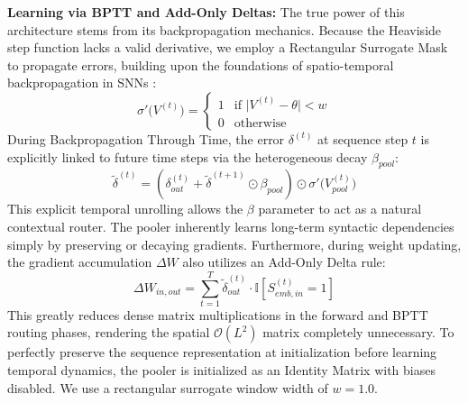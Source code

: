\documentclass{article} %
\begin{document}
\textbf{Learning via BPTT and Add-Only Deltas:} The true power of this architecture stems from its backpropagation mechanics. Because the Heaviside step function lacks a valid derivative, we employ a Rectangular Surrogate Mask to propagate errors, building upon the foundations of spatio-temporal backpropagation in SNNs \citep{neftci2019surrogate}:
\begin{equation}
\sigma'\big(V^{(t)}\big) = \begin{cases} 1 & \text{if } \big|V^{(t)} - \theta\big| < w \\ 0 & \text{otherwise} \end{cases}
\end{equation}
During Backpropagation Through Time, the error $\delta^{(t)}$ at sequence step $t$ is explicitly linked to future time steps via the heterogeneous decay $\beta_{pool}$:
\begin{equation}
\tilde{\delta}^{(t)} = \left( \delta_{out}^{(t)} + \tilde{\delta}^{(t+1)} \odot \beta_{pool} \right) \odot \sigma'\big(V_{pool}^{(t)}\big)
\end{equation}
This explicit temporal unrolling allows the $\beta$ parameter to act as a natural contextual router. The pooler inherently learns long-term syntactic dependencies simply by preserving or decaying gradients. Furthermore, during weight updating, the gradient accumulation $\Delta W$ also utilizes an Add-Only Delta rule:
\begin{equation}
\Delta W_{in, out} = \sum_{t=1}^{T} \tilde{\delta}^{(t)}_{out} \cdot \mathbb{I}\left[ S_{emb, in}^{(t)} = 1 \right]
\end{equation}
This greatly reduces dense matrix multiplications in the forward and BPTT routing phases, rendering the spatial $\mathcal{O}(L^2)$ matrix completely unnecessary. To perfectly preserve the sequence representation at initialization before learning temporal dynamics, the pooler is initialized as an Identity Matrix with biases disabled. We use a rectangular surrogate window width of $w=1.0$.
\end{document}
